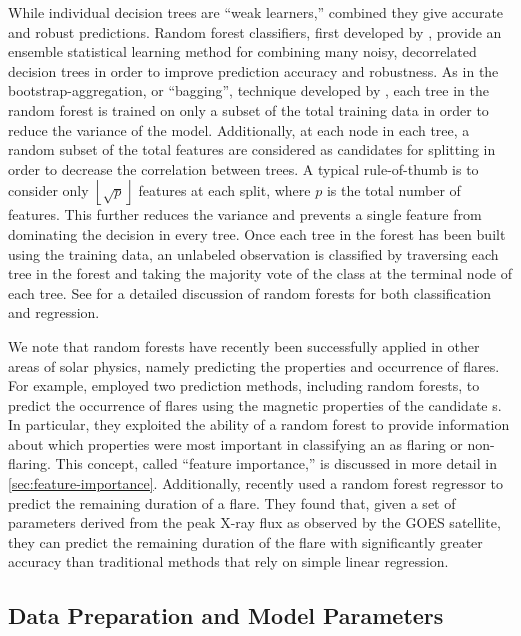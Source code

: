 While individual decision trees are ``weak learners,'' combined they give accurate and robust predictions.
Random forest classifiers, first developed by  \citet{breiman_random_2001}, provide an ensemble statistical learning method for combining many noisy, decorrelated decision trees in order to improve prediction accuracy and robustness.
As in the bootstrap-aggregation, or ``bagging'', technique developed by \citet{breiman_bagging_1996}, each tree in the random forest is trained on only a subset of the total training data in order to reduce the variance of the model.
Additionally, at each node in each tree, a random subset of the total features are considered as candidates for splitting in order to decrease the correlation between trees.
A typical rule-of-thumb is to consider only $\left\lfloor\sqrt{p}\right\rfloor$ features at each split, where $p$ is the total number of features.
This further reduces the variance and prevents a single feature from dominating the decision in every tree.
Once each tree in the forest has been built using the training data, an unlabeled observation is classified by traversing each tree in the forest and taking the majority vote of the class at the terminal node of each tree.
See \citet[chapter 15]{hastie_elements_2009} for a detailed discussion of random forests for both classification and regression.

We note that random forests have recently been successfully applied in other areas of solar physics, namely predicting the properties and occurrence of flares.
For example, \citet{campi_feature_2019} employed two prediction methods, including random forests, to predict the occurrence of flares using the magnetic properties of the candidate \AR s.
In particular, they exploited the ability of a random forest to provide information about which properties were most important in classifying an \AR{} as flaring or non-flaring.
This concept, called ``feature importance,'' is discussed in more detail in \autoref{sec:feature-importance}.
Additionally, \citet{reep_forecasting_2021} recently used a random forest regressor to predict the remaining duration of a flare.
They found that, given a set of parameters derived from the peak X-ray flux as observed by the GOES satellite, they can predict the remaining duration of the flare with significantly greater accuracy than traditional methods that rely on simple linear regression.

\subsection{Data Preparation and Model Parameters}\label{sec:data-prep}

